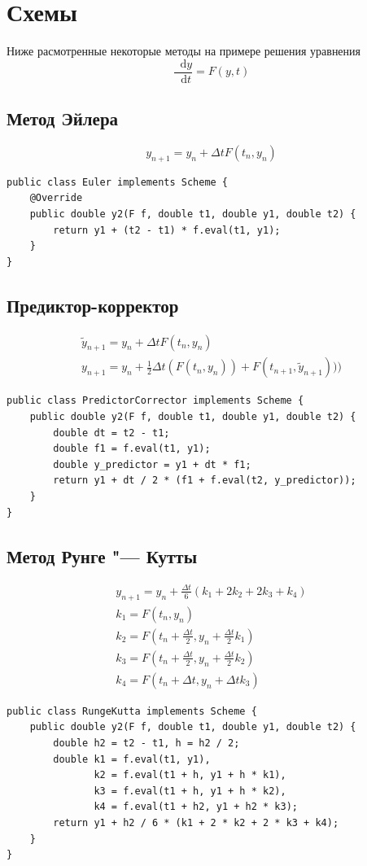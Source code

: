 \documentclass[a4paper, titlepage]{article}
\newcommand*\dd{\mathop{}\!\mathrm{d}}
\begin{document}
\section{Схемы}
Ниже расмотренные некоторые методы на примере решения уравнения $$ \frac{\dd y}{\dd t} = F(y,t) $$

\subsection{Метод Эйлера}
$$ y_{n+1} = y_n + \Delta t F(t_n, y_n) $$
\begin{lstlisting}
public class Euler implements Scheme {
    @Override
    public double y2(F f, double t1, double y1, double t2) {
        return y1 + (t2 - t1) * f.eval(t1, y1);
    }
}
\end{lstlisting}

\subsection{Предиктор-корректор}

\begin{equation*}
\begin{array}{l}
\tilde{y}_{n+1} = y_n + \Delta t F(t_n, y_n) \\[0.5em]
y_{n+1} = y_n + \frac{1}{2}\Delta t (F(t_n, y_n)) + F(t_{n+1}, \tilde{y}_{n+1})) )
\end{array}
\end{equation*}
\begin{lstlisting}
public class PredictorCorrector implements Scheme {
    public double y2(F f, double t1, double y1, double t2) {
        double dt = t2 - t1;
        double f1 = f.eval(t1, y1);
        double y_predictor = y1 + dt * f1;
        return y1 + dt / 2 * (f1 + f.eval(t2, y_predictor));
    }
}
\end{lstlisting}

\subsection{Метод Рунге "--- Кутты}
\begin{equation*}
\begin{array}{l}
y_{n+1} = y_n + \frac{\Delta t}{6}(k_1 + 2k_2 + 2k_3 + k_4) \\[0.4em]
k_1 = F(t_n, y_n) \\[0.4em]
k_2 = F(t_n + \frac{\Delta t}{2}, y_n + \frac{\Delta t}{2}k_1) \\[0.4em]
k_3 = F(t_n + \frac{\Delta t}{2}, y_n + \frac{\Delta t}{2}k_2) \\[0.4em]
k_4 = F(t_n+ \Delta t, y_n + \Delta t k_3)
\end{array}
\end{equation*}
\begin{lstlisting}
public class RungeKutta implements Scheme {
    public double y2(F f, double t1, double y1, double t2) {
        double h2 = t2 - t1, h = h2 / 2;
        double k1 = f.eval(t1, y1),
               k2 = f.eval(t1 + h, y1 + h * k1),
               k3 = f.eval(t1 + h, y1 + h * k2),
               k4 = f.eval(t1 + h2, y1 + h2 * k3);
        return y1 + h2 / 6 * (k1 + 2 * k2 + 2 * k3 + k4);
    }
}
\end{lstlisting}
\end{document}
